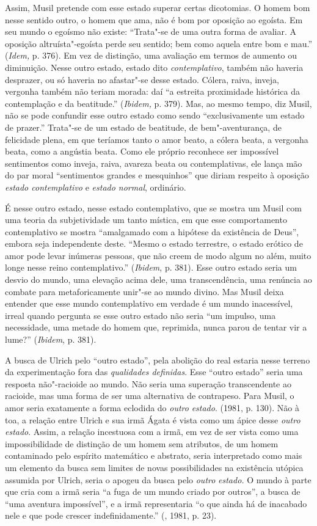 Assim, Musil pretende com esse estado superar certas dicotomias. O homem
bom nesse sentido outro, o homem que ama, não é bom por oposição ao
egoísta. Em seu mundo o egoísmo não existe: ``Trata"-se de uma outra
forma de avaliar. A oposição altruísta"-egoísta perde seu sentido; bem
como aquela entre bom e mau.'' (\emph{Idem,} p. 376). Em vez de
distinção, uma avaliação em termos de aumento ou diminuição. Nesse outro
estado, estado dito \emph{contemplativo}, também não haveria desprazer,
ou só haveria no afastar"-se desse estado. Cólera, raiva, inveja,
vergonha também não teriam morada: daí ``a estreita proximidade
histórica da contemplação e da beatitude.'' (\emph{Ibidem,} p. 379). Mas,
ao mesmo tempo, diz Musil, não se pode confundir esse outro estado como
sendo ``exclusivamente um estado de prazer.'' Trata"-se de um estado de
beatitude, de bem"-aventurança, de felicidade plena, em que teríamos
tanto o amor beato, a cólera beata, a vergonha beata, como a angústia
beata. Como ele próprio reconhece ser impossível sentimentos como
inveja, raiva, avareza beata ou contemplativas, ele lança mão do par
moral ``sentimentos grandes e mesquinhos'' que diriam respeito à
oposição \emph{estado contemplativo} e \emph{estado normal}, ordinário.

É nesse outro estado, nesse estado contemplativo, que se mostra um Musil
com uma teoria da subjetividade um tanto mística, em que esse
comportamento contemplativo se mostra ``amalgamado com a hipótese da
existência de Deus'', embora seja independente deste. ``Mesmo o estado
terrestre, o estado erótico de amor pode levar inúmeras pessoas, que não
creem de modo algum no além, muito longe nesse reino contemplativo.''
(\emph{Ibidem}, p. 381). Esse outro estado seria um desvio do mundo, uma
elevação acima dele, uma transcendência, uma renúncia ao combate para
metaforicamente unir"-se ao mundo divino. Mas Musil deixa entender que
esse mundo contemplativo em verdade é um mundo inacessível, irreal
quando pergunta se esse outro estado não seria ``um impulso, uma
necessidade, uma metade do homem que, reprimida, nunca parou de tentar
vir a lume?'' (\emph{Ibidem}, p. 381).

A busca de Ulrich pelo ``outro estado'', pela abolição do real estaria
nesse terreno da experimentação fora das \emph{qualidades definidas}.
Esse ``outro estado'' seria uma resposta não"-racioide ao mundo. Não
seria uma superação transcendente ao racioide, mas uma forma de ser uma
alternativa de contrapeso. Para Musil, o amor seria exatamente a forma
eclodida do \emph{outro} \emph{estado}. (1981, p. 130). Não à toa, a
relação entre Ulrich e sua irmã Ágata é vista como um ápice desse
\emph{outro estado}. Assim, a relação incestuosa com a irmã, em vez de
ser vista como uma impossibilidade de distinção de um homem sem
atributos, de um homem contaminado pelo espírito matemático e abstrato,
seria interpretado como mais um elemento da busca sem limites de novas
possibilidades na existência utópica assumida por Ulrich, seria o apogeu
da busca pelo \emph{outro} \emph{estado.} O mundo à parte que cria com a
irmã seria ``a fuga de um mundo criado por outros'', a busca de ``uma
aventura impossível'', e a irmã representaria ``o que ainda há de
inacabado nele e que pode crescer indefinidamente.'' (, 1981, p.
23).

